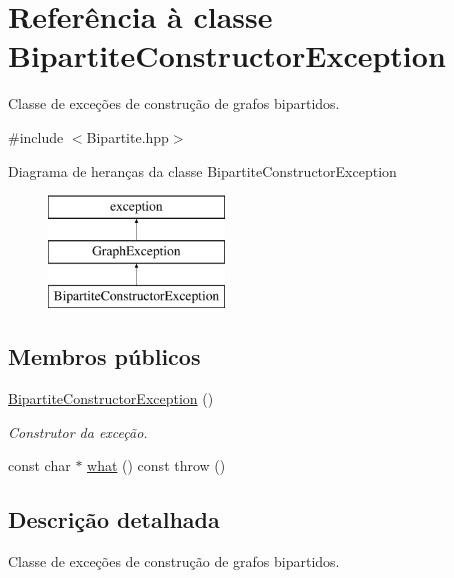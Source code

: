 \hypertarget{classBipartiteConstructorException}{}\section{Referência à classe Bipartite\+Constructor\+Exception}
\label{classBipartiteConstructorException}


Classe de exceções de construção de grafos bipartidos.  




{\ttfamily \#include $<$Bipartite.\+hpp$>$}

Diagrama de heranças da classe Bipartite\+Constructor\+Exception\begin{figure}[H]
\begin{center}
\leavevmode
\includegraphics[height=3.000000cm]{classBipartiteConstructorException}
\end{center}
\end{figure}
\subsection*{Membros públicos}
\begin{DoxyCompactItemize}
\item 
\mbox{\label{classBipartiteConstructorException_a303013e25057612d9cac2e7450943d6d}} 
\hyperlink{classBipartiteConstructorException_a303013e25057612d9cac2e7450943d6d}{Bipartite\+Constructor\+Exception} ()
\begin{DoxyCompactList}\small\item\em Construtor da exceção. \end{DoxyCompactList}\item 
const char $\ast$ \hyperlink{classBipartiteConstructorException_a11f033387020957b5ccd952914475807}{what} () const  throw ()
\end{DoxyCompactItemize}


\subsection{Descrição detalhada}
Classe de exceções de construção de grafos bipartidos. 

